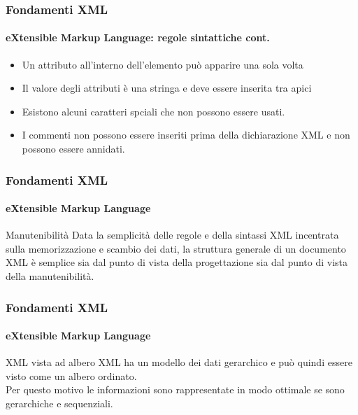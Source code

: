 \begin{frame}
	\frametitle{Fondamenti XML}
	\framesubtitle{eXtensible Markup Language: regole sintattiche cont.}
	\addtocounter{nframe}{1}

	\begin{itemize}
		\item Un attributo all'interno dell'elemento può apparire una sola volta
		
		\item Il valore degli attributi è una stringa e deve essere inserita tra apici

		\item Esistono alcuni caratteri spciali che non possono essere usati. 

		\item I commenti non possono essere inseriti prima della dichiarazione XML e non possono essere annidati.

	\end{itemize}

\end{frame}

\begin{frame}
	\frametitle{Fondamenti XML}
	\framesubtitle{eXtensible Markup Language}
	\addtocounter{nframe}{1}

	\begin{block}{Manutenibilità}
		Data la semplicità delle regole e della sintassi XML incentrata sulla memorizzazione e scambio dei dati, la struttura generale di un documento XML è semplice sia dal punto di vista della progettazione sia dal punto di vista della manutenibilità.
	\end{block}

\end{frame}

\begin{frame}
	\frametitle{Fondamenti XML}
	\framesubtitle{eXtensible Markup Language}
	\addtocounter{nframe}{1}

	\begin{block}{XML vista ad albero}
		XML ha un modello dei dati gerarchico e può quindi essere visto come un albero ordinato.
		\\Per questo motivo le informazioni sono rappresentate in modo ottimale se sono gerarchiche e sequenziali.
	\end{block}

\end{frame}


